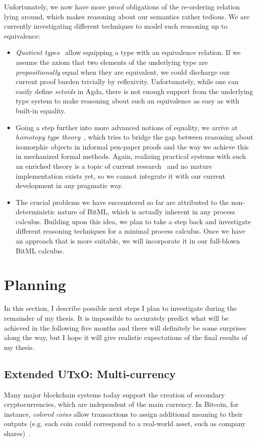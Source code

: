 \documentclass[acmsmall,nonacm=true,screen=true]{acmart}
\begin{document}
Unfortunately, we now have more proof obligations of the re-ordering relation lying around, which makes reasoning about
our semantics rather tedious. We are currently investigating different techniques to model such reasoning up to equivalence:
\begin{itemize}
\item \textit{Quotient types}~\cite{quotient} allow equipping a type with an equivalence relation.
If we assume the axiom that two elements of the underlying type are \textit{propositionally} equal when they are equivalent,
we could discharge our current proof burden trivially by reflexivity.
Unfortunately, while one can easily define \textit{setoids} in Agda, there is not enough support from the underlying type system to make reasoning about such an equivalence as easy as with built-in equality.
\item Going a step further into more advanced notions of equality, we arrive at \textit{homotopy type theory}~\cite{homotopy},
which tries to bridge the gap between reasoning about isomorphic objects in informal pen-paper proofs
and the way we achieve this in mechanized formal methods.
Again, realizing practical systems with such an enriched theory is a topic of current research~\cite{cubical} and no mature implementation exists yet, so we cannot integrate it with our current development in any pragmatic way.
\item The crucial problems we have encountered so far are attributed to the non-deterministic nature of BitML, which is actually
inherent in any process calculus. Building upon this idea, we plan to take a step back and investigate different reasoning
techniques for a minimal process calculus. Once we have an approach that is more suitable, we will incorporate it
in our full-blown BitML calculus.
\end{itemize}

\section{Planning}
\label{sec:plan}
In this section, I describe possible next steps I plan to investigate during the remainder of my thesis.
It is impossible to accurately predict what will be achieved in the following five months
and there will definitely be some surprises along the way,
but I hope it will give realistic expectations of the final results of my thesis.

\subsection{Extended UTxO: Multi-currency}
Many major blockchain systems today support the creation of secondary cryptocurrencies, which are independent of the main  currency.
In Bitcoin, for instance, \textit{colored coins} allow transactions to assign additional meaning to their outputs
(e.g. each coin could correspond to a real-world asset, such as company shares)~\cite{coloredcoins}.
\end{document}
